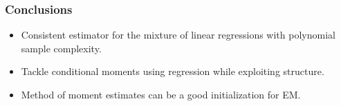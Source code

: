 \documentclass[xcolor={svgnames}]{beamer}
\begin{document}
\begin{frame}
  \frametitle{Conclusions}
  \begin{itemize}
    \item Consistent estimator for the mixture of linear regressions with polynomial sample complexity.
    \item Tackle conditional moments using regression while exploiting structure.
    \item Method of moment estimates can be a good initialization for EM.
  \end{itemize}
\end{frame}
\end{document}
